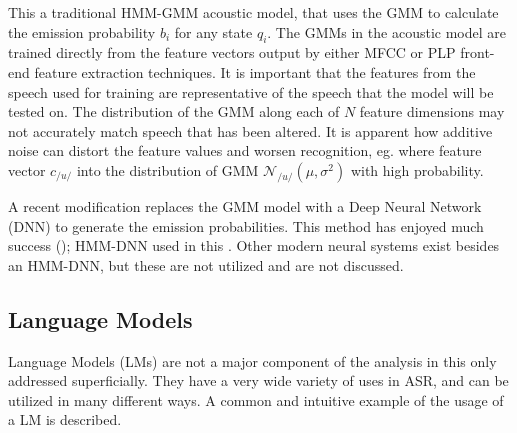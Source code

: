 This \DIFdelbegin {}\DIFdelend \DIFaddbegin {}\DIFaddend a traditional HMM-GMM acoustic model, that uses the GMM to calculate the emission probability $b_i$ for any state $q_i$.  The GMMs in the acoustic model are trained directly from the feature vectors output by either MFCC or PLP front-end feature extraction techniques.  It is important that the features from the speech used for training are representative of the speech that the model will be tested on.  The distribution of the GMM along each of $N$ feature dimensions may not accurately match speech that has been altered.  It is apparent how additive noise can distort the feature values and worsen recognition, eg. where \DIFdelbegin {}\DIFdelend \DIFaddbegin {}\DIFaddend feature vector $c_{/u/}$ \DIFdelbegin {}\DIFdelend \DIFaddbegin {}\DIFaddend into the distribution of GMM $\mathcal{N}_{/u/}(\mu,\sigma^2)$ with high probability.

A recent modification replaces the GMM model with a Deep Neural Network (DNN) to generate the emission probabilities. This method has enjoyed much success (\cite{zhang:17}); \DIFdelbegin {}\DIFdelend \DIFaddbegin {}\DIFaddend HMM-DNN \DIFdelbegin {}\DIFdelend \DIFaddbegin {}\DIFaddend used in this \DIFdelbegin {}\DIFdelend \DIFaddbegin {}\DIFaddend .  Other modern neural \DIFdelbegin {}\DIFdelend \DIFaddbegin {}\DIFaddend systems exist besides an HMM-DNN, but these are not utilized and are not discussed.



\DIFdelbegin \subsubsection{}
\addtocounter{subsubsection}{-1}%
\DIFdelend \DIFaddbegin \subsection{Language Models}\label{sec:lang-mod}
\DIFaddend 

Language Models (LMs) are not a major component of the analysis in this \DIFdelbegin {}\DIFdelend \DIFaddbegin {}\DIFaddend only addressed superficially.  They have a very wide variety of uses in ASR, and can be utilized in many different ways.  A common and intuitive example of the usage of a LM is described.

